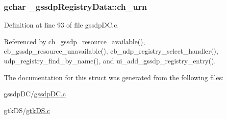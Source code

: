 \hypertarget{struct__gssdp_registry_data_a57a14b78092cbef8cf6dfa56cffa03db}{}
\subsubsection[{ch\+\_\+urn}]{\setlength{\rightskip}{0pt plus 5cm}gchar \+\_\+gssdp\+Registry\+Data\+::ch\+\_\+urn}\label{struct__gssdp_registry_data_a57a14b78092cbef8cf6dfa56cffa03db}


Definition at line 93 of file gssdp\+D\+C.\+c.



Referenced by cb\+\_\+gssdp\+\_\+resource\+\_\+available(), cb\+\_\+gssdp\+\_\+resource\+\_\+unavailable(), cb\+\_\+udp\+\_\+registry\+\_\+select\+\_\+handler(), udp\+\_\+registry\+\_\+find\+\_\+by\+\_\+name(), and ui\+\_\+add\+\_\+gssdp\+\_\+registry\+\_\+entry().



The documentation for this struct was generated from the following files\+:\begin{DoxyCompactItemize}
\item 
gssdp\+D\+C/\hyperlink{gssdp_d_c_8c}{gssdp\+D\+C.\+c}\item 
gtk\+D\+S/\hyperlink{gtk_d_s_8c}{gtk\+D\+S.\+c}\end{DoxyCompactItemize}
